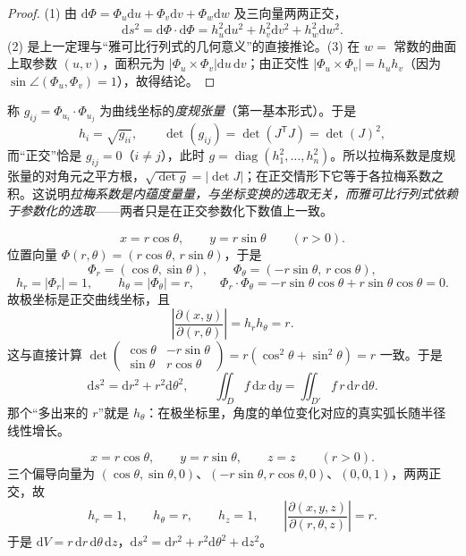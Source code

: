 \begin{proof}
(1) 由 \(\mathrm{d}\Phi=\Phi_u\mathrm{d}u+\Phi_v\mathrm{d}v+\Phi_w\mathrm{d}w\) 及三向量两两正交，
\[
\mathrm{d}s^2=\mathrm{d}\Phi\cdot\mathrm{d}\Phi=h_u^2\mathrm{d}u^2+h_v^2\mathrm{d}v^2+h_w^2\mathrm{d}w^2 .
\]
(2) 是上一定理与“雅可比行列式的几何意义”的直接推论。(3) 在 \(w=\) 常数的曲面上取参数 \((u,v)\)，面积元为 \(\left|\Phi_u\times\Phi_v\right|\mathrm{d}u\,\mathrm{d}v\)；由正交性 \(\left|\Phi_u\times\Phi_v\right|=h_uh_v\)（因为 \(\sin\angle(\Phi_u,\Phi_v)=1\)），故得结论。
\end{proof}

\begin{remark}[与度规张量的关系]
称 \(g_{ij}=\Phi_{u_i}\cdot\Phi_{u_j}\) 为曲线坐标的\emph{度规张量}（第一基本形式）。于是
\[
h_i=\sqrt{g_{ii}},\qquad
\det(g_{ij})=\det(J^{\mathsf T}J)=\det(J)^2 ,
\]
而“正交”恰是 \(g_{ij}=0\)（\(i\ne j\)），此时 \(g=\operatorname{diag}(h_1^2,\dots,h_n^2)\)。所以拉梅系数是度规张量的对角元之平方根，\(\sqrt{\det g}=\left|\det J\right|\)；在正交情形下它等于各拉梅系数之积。这说明\emph{拉梅系数是内蕴度量量，与坐标变换的选取无关，而雅可比行列式依赖于参数化的选取}——两者只是在正交参数化下数值上一致。
\end{remark}

\begin{example}[平面极坐标]
\[
x=r\cos\theta,\qquad y=r\sin\theta\qquad(r>0).
\]
位置向量 \(\Phi(r,\theta)=(r\cos\theta,\,r\sin\theta)\)，于是
\[
\Phi_r=(\cos\theta,\sin\theta),\qquad \Phi_\theta=(-r\sin\theta,\,r\cos\theta),
\]
\[
h_r=\left|\Phi_r\right|=1,\qquad h_\theta=\left|\Phi_\theta\right|=r,
\qquad \Phi_r\cdot\Phi_\theta=-r\sin\theta\cos\theta+r\sin\theta\cos\theta=0 .
\]
故极坐标是正交曲线坐标，且
\[
\left|\frac{\partial(x,y)}{\partial(r,\theta)}\right|=h_rh_\theta=r .
\]
这与直接计算 \(\det\begin{pmatrix}\cos\theta & -r\sin\theta\\ \sin\theta & r\cos\theta\end{pmatrix}=r(\cos^2\theta+\sin^2\theta)=r\) 一致。于是
\[
\mathrm{d}s^2=\mathrm{d}r^2+r^2\mathrm{d}\theta^2,\qquad
\iint_D f\,\mathrm{d}x\,\mathrm{d}y=\iint_{D'} f\,r\,\mathrm{d}r\,\mathrm{d}\theta .
\]
那个“多出来的 \(r\)”就是 \(h_\theta\)：在极坐标里，角度的单位变化对应的真实弧长随半径线性增长。
\end{example}

\begin{example}[柱坐标]
\[
x=r\cos\theta,\qquad y=r\sin\theta,\qquad z=z\qquad(r>0).
\]
三个偏导向量为 \((\cos\theta,\sin\theta,0)\)、\((-r\sin\theta,r\cos\theta,0)\)、\((0,0,1)\)，两两正交，故
\[
h_r=1,\qquad h_\theta=r,\qquad h_z=1,
\qquad
\left|\frac{\partial(x,y,z)}{\partial(r,\theta,z)}\right|=r .
\]
于是 \(\mathrm{d}V=r\,\mathrm{d}r\,\mathrm{d}\theta\,\mathrm{d}z\)，\(\mathrm{d}s^2=\mathrm{d}r^2+r^2\mathrm{d}\theta^2+\mathrm{d}z^2\)。
\end{example}


